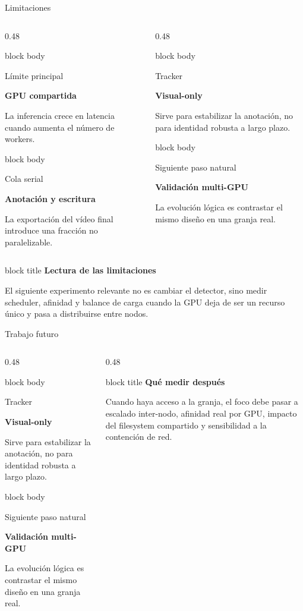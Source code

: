 \documentclass[aspectratio=169,11pt]{beamer}
\newcommand{\metriccard}[3]{
  \begin{beamercolorbox}[wd=\linewidth,sep=0.65em,rounded=true,shadow=false]{block body}
    {\small\color{GraphGray}#1\par}
    \vspace{0.1em}
    {\bfseries\fontsize{16}{18}\selectfont #2\par}
    \vspace{0.1em}
    {\footnotesize #3\par}
  \end{beamercolorbox}
}
\newcommand{\callout}[2]{
  \begin{beamercolorbox}[wd=\linewidth,sep=0.6em,rounded=true,shadow=false]{block title}
    {\bfseries #1}\par
    \vspace{0.15em}
    {\footnotesize #2}
  \end{beamercolorbox}
}
\begin{document}
\begin{frame}{Limitaciones}
  \begin{columns}[T,totalwidth=\textwidth]
    \begin{column}{0.48\textwidth}
      \metriccard{Límite principal}{GPU compartida}{La inferencia crece en latencia cuando aumenta el número de workers.}
      \vspace{0.25em}
      \metriccard{Cola serial}{Anotación y escritura}{La exportación del vídeo final introduce una fracción no paralelizable.}
    \end{column}
    \begin{column}{0.48\textwidth}
      \metriccard{Tracker}{Visual-only}{Sirve para estabilizar la anotación, no para identidad robusta a largo plazo.}
      \vspace{0.25em}
      \metriccard{Siguiente paso natural}{Validación multi-GPU}{La evolución lógica es contrastar el mismo diseño en una granja real.}
    \end{column}
  \end{columns}

  \vspace{0.3em}
  \callout{Lectura de las limitaciones}{
    El siguiente experimento relevante no es cambiar el detector, sino medir scheduler, afinidad y balance de carga cuando la GPU deja de ser un recurso único y pasa a distribuirse entre nodos.}
\end{frame}

\begin{frame}{Trabajo futuro}
  \begin{columns}[T,totalwidth=\textwidth]
    \begin{column}{0.48\textwidth}
      \metriccard{Tracker}{Visual-only}{Sirve para estabilizar la anotación, no para identidad robusta a largo plazo.}
      \vspace{0.25em}
      \metriccard{Siguiente paso natural}{Validación multi-GPU}{La evolución lógica es contrastar el mismo diseño en una granja real.}
    \end{column}
    \begin{column}{0.48\textwidth}
      \callout{Qué medir después}{
        Cuando haya acceso a la granja, el foco debe pasar a escalado inter-nodo, afinidad real por GPU, impacto del filesystem compartido y sensibilidad a la contención de red.}
    \end{column}
  \end{columns}
\end{frame}
\end{document}

